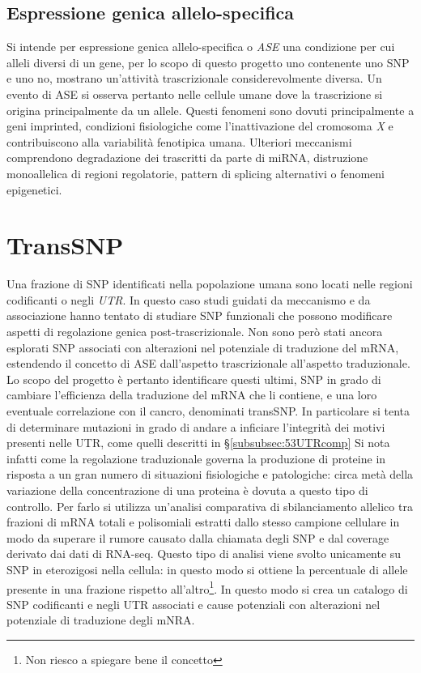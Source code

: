 \subsection{Espressione genica allelo-specifica}
Si intende per espressione genica allelo-specifica o \emph{ASE} una condizione per cui alleli diversi di un gene, per lo scopo di questo progetto uno contenente uno SNP e uno no, mostrano un'attivit\`a trascrizionale considerevolmente diversa.
Un evento di ASE si osserva pertanto nelle cellule umane dove la trascrizione si origina principalmente da un allele.
Questi fenomeni sono dovuti principalmente a geni imprinted, condizioni fisiologiche come l'inattivazione del cromosoma \emph{X} e contribuiscono alla variabilit\`a fenotipica umana.
Ulteriori meccanismi comprendono degradazione dei trascritti da parte di miRNA, distruzione monoallelica di regioni regolatorie, pattern di splicing alternativi o fenomeni epigenetici.

\section{TransSNP}
Una frazione di SNP identificati nella popolazione umana sono locati nelle regioni codificanti o negli \emph{UTR}.
In questo caso studi guidati da meccanismo e da associazione hanno tentato di studiare SNP funzionali che possono modificare aspetti di regolazione genica post-trascrizionale.
Non sono per\`o stati ancora esplorati SNP associati con alterazioni nel potenziale di traduzione del mRNA, estendendo il concetto di ASE dall'aspetto trascrizionale all'aspetto traduzionale.
Lo scopo del progetto \`e pertanto identificare questi ultimi, SNP in grado di cambiare l'efficienza della traduzione del mRNA che li contiene, e una loro eventuale correlazione con il cancro, denominati transSNP.
In particolare si tenta di determinare mutazioni in grado di andare a inficiare l'integrit\`a dei motivi presenti nelle UTR, come quelli descritti in \S\ref{subsubsec:53UTRcomp}
Si nota infatti come la regolazione traduzionale governa la produzione di proteine in risposta a un gran numero di situazioni fisiologiche e patologiche: circa met\`a della variazione della concentrazione di una proteina \`e dovuta a questo tipo di controllo.
Per farlo si utilizza un'analisi comparativa di sbilanciamento allelico tra frazioni di mRNA totali e polisomiali estratti dallo stesso campione cellulare in modo da superare il rumore causato dalla chiamata degli SNP e dal coverage derivato dai dati di RNA-seq.
Questo tipo di analisi viene svolto unicamente su SNP in eterozigosi nella cellula: in questo modo si ottiene la percentuale di allele presente in una frazione rispetto all'altro\footnote{Non riesco a spiegare bene il concetto}.
In questo modo si crea un catalogo di SNP codificanti e negli UTR associati e cause potenziali con alterazioni nel potenziale di traduzione degli mNRA.



